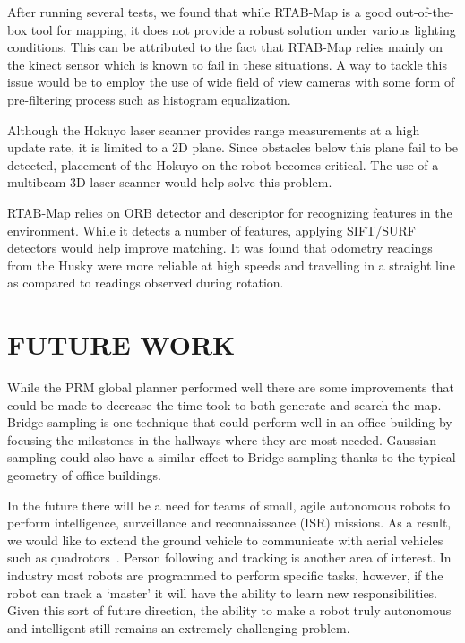 \documentclass[letterpaper, 10 pt, conference]{ieeeconf}  %
\begin{document}
After running several tests, we found that while RTAB-Map is a good out-of-the-box tool for mapping, it does not provide a robust solution under various lighting conditions. This can be attributed to the fact that RTAB-Map relies mainly on the kinect sensor which is known to fail in these situations. A way to tackle this issue would be to employ the use of wide field of view cameras with some form of pre-filtering process such as histogram equalization.

Although the Hokuyo laser scanner provides range measurements at a high update rate, it is limited to a 2D plane. Since obstacles below this plane fail to be detected, placement of the Hokuyo on the robot becomes critical. The use of a multibeam 3D laser scanner would help solve this problem.

RTAB-Map relies on ORB detector and descriptor for recognizing features in the environment. While it detects a number of features, applying SIFT/SURF detectors would help improve matching. It was found that odometry readings from the Husky were more reliable at high speeds and travelling in a straight line as compared to readings observed during rotation.

\section{FUTURE WORK}

While the PRM global planner performed well there are some improvements that could be made to decrease the time took to both generate and search the map. Bridge sampling is one technique that could perform well in an office building by focusing the milestones in the hallways where they are most needed. Gaussian sampling could also have a similar effect to Bridge sampling thanks to the typical geometry of office buildings.

In the future there will be a need for teams of small, agile autonomous robots to perform intelligence, surveillance and reconnaissance (ISR) missions. As a result, we would like to extend the ground vehicle to communicate with aerial vehicles such as quadrotors~\cite{target}. Person following and tracking is another area of interest. In industry most robots are programmed to perform specific tasks, however, if the robot can track a \enquote*{master} it will have the ability to learn new responsibilities. Given this sort of future direction, the ability to make a robot truly autonomous and intelligent still remains an extremely challenging problem.
\end{document}
